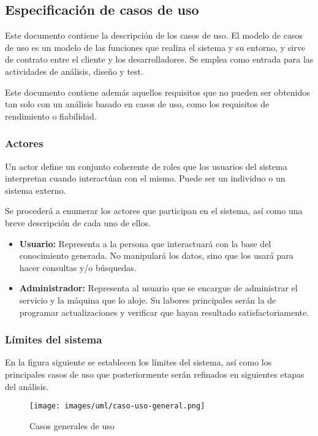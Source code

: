 
\subsection{Especificación de casos de uso}\label{sec:espec-casos-uso}

Este documento contiene la descripción de los casos de uso. El modelo 
de casos de uso es un modelo de las funciones que realiza el sistema y 
su entorno, y sirve de contrato entre el cliente y los desarrolladores. 
Se emplea como entrada para las actividades de análisis, diseño y test.

Este documento contiene además aquellos requisitos que no pueden ser 
obtenidos tan solo con un análisis basado en casos de uso, como los 
requisitos de rendimiento o fiabilidad.

\subsubsection{Actores}

Un actor define un conjunto coherente de roles que los usuarios del 
sistema interpretan cuando interactúan con el mismo. Puede ser un 
individuo o un sistema externo.

Se procederá a enumerar los actores que participan en el sistema, 
así como una breve descripción de cada uno de ellos.

\begin{itemize}
  \item \textbf{Usuario:} Representa a la persona que interactuará con 
	la base del conocimiento generada. No manipulará los datos, 
	sino que los usará para hacer consultas y/o búsquedas.
  \item \textbf{Administrador:} Representa al usuario que se encargue 
	de administrar el servicio y la máquina que lo aloje. Su labores 
	principales serán la de programar actualizaciones y verificar 
	que hayan resultado satisfactoriamente.
\end{itemize}

\subsubsection{Límites del sistema}

En la figura siguiente se establecen los límites del sistema, así 
como los principales casos de uso que posteriormente serán refinados 
en siguientes etapas del análisis.

\begin{figure}[ht]
 	\centering
	\texttt{[image: images/uml/caso-uso-general.png]}
	\caption{Casos generales de uso}
	\label{fig:uml:casos-uso}
\end{figure}

